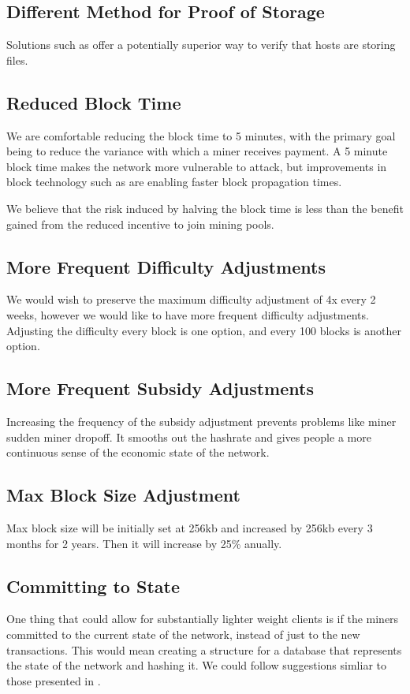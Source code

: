 \documentclass[twocolumn]{article}
\begin{document}
\subsection{Different Method for Proof of Storage}
Solutions such as \cite{cpr} offer a potentially superior way to verify that hosts are storing files.

\subsection{Reduced Block Time}
We are comfortable reducing the block time to 5 minutes, with the primary goal being to reduce the variance with which a miner receives payment.
A 5 minute block time makes the network more vulnerable to attack, but improvements in block technology such as \cite{ibf} are enabling faster block propagation times.

We believe that the risk induced by halving the block time is less than the benefit gained from the reduced incentive to join mining pools.

\subsection{More Frequent Difficulty Adjustments}
We would wish to preserve the maximum difficulty adjustment of 4x every 2 weeks, however we would like to have more frequent difficulty adjustments.
Adjusting the difficulty every block is one option, and every 100 blocks is another option.

\subsection{More Frequent Subsidy Adjustments}
Increasing the frequency of the subsidy adjustment prevents problems like miner sudden miner dropoff.
It smooths out the hashrate and gives people a more continuous sense of the economic state of the network.

\subsection{Max Block Size Adjustment}
Max block size will be initially set at 256kb and increased by 256kb every 3 months for 2 years.
Then it will increase by 25\% anually.

\subsection{Committing to State}
One thing that could allow for substantially lighter weight clients is if the miners committed to the current state of the network, instead of just to the new transactions.
This would mean creating a structure for a database that represents the state of the network and hashing it.
We could follow suggestions simliar to those presented in \cite{ubc}.
\end{document}
